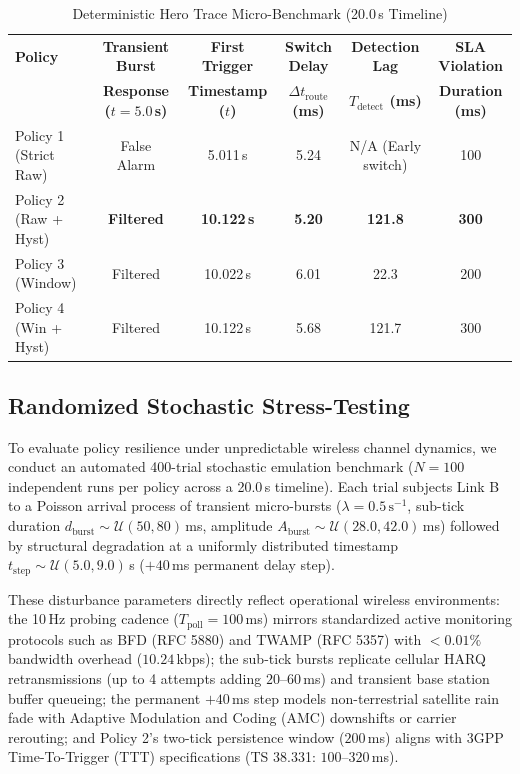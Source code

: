 \documentclass[conference]{IEEEtran}
\begin{document}
\begin{table}[htbp]
\caption{Deterministic Hero Trace Micro-Benchmark (20.0\,s Timeline)}
\label{tab:hero_trace_metrics}
\centering
\begin{tabular}{lccccc}
\toprule
\textbf{Policy} & \textbf{Transient Burst} & \textbf{First Trigger} & \textbf{Switch Delay} & \textbf{Detection Lag} & \textbf{SLA Violation} \\
& \textbf{Response ($t=5.0$\,s)} & \textbf{Timestamp ($t$)} & \textbf{$\Delta t_{\text{route}}$ (ms)} & \textbf{$T_{\text{detect}}$ (ms)} & \textbf{Duration (ms)} \\
\midrule
Policy 1 (Strict Raw)    & False Alarm          & 5.011\,s          & 5.24       & N/A (Early switch) & 100 \\
Policy 2 (Raw + Hyst)    & \textbf{Filtered}    & \textbf{10.122\,s} & \textbf{5.20} & \textbf{121.8}     & \textbf{300} \\
Policy 3 (Window)        & Filtered             & 10.022\,s          & 6.01       & 22.3               & 200 \\
Policy 4 (Win + Hyst)    & Filtered             & 10.122\,s          & 5.68       & 121.7              & 300 \\
\bottomrule
\end{tabular}
\end{table}

\subsection{Randomized Stochastic Stress-Testing}
\label{sec:stochastic_eval}

To evaluate policy resilience under unpredictable wireless channel dynamics, we conduct an automated 400-trial stochastic emulation benchmark ($N = 100$ independent runs per policy across a 20.0\,s timeline). Each trial subjects Link B to a Poisson arrival process of transient micro-bursts ($\lambda = 0.5\,\text{s}^{-1}$, sub-tick duration $d_{\text{burst}} \sim \mathcal{U}(50, 80)$\,ms, amplitude $A_{\text{burst}} \sim \mathcal{U}(28.0, 42.0)$\,ms) followed by structural degradation at a uniformly distributed timestamp $t_{\text{step}} \sim \mathcal{U}(5.0, 9.0)$\,s ($+40$\,ms permanent delay step).

These disturbance parameters directly reflect operational wireless environments: the 10\,Hz probing cadence ($T_{\text{poll}} = 100$\,ms) mirrors standardized active monitoring protocols such as BFD (RFC 5880) and TWAMP (RFC 5357) with $<0.01\%$ bandwidth overhead ($10.24$\,kbps); the sub-tick bursts replicate cellular HARQ retransmissions (up to 4 attempts adding $20\text{--}60$\,ms) and transient base station buffer queueing; the permanent $+40$\,ms step models non-terrestrial satellite rain fade with Adaptive Modulation and Coding (AMC) downshifts or carrier rerouting; and Policy 2's two-tick persistence window ($200$\,ms) aligns with 3GPP Time-To-Trigger (TTT) specifications (TS 38.331: $100\text{--}320$\,ms).
\end{document}

